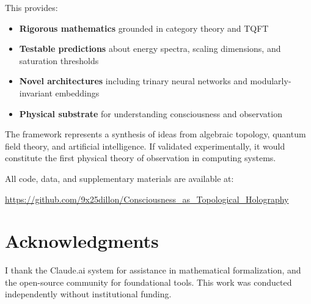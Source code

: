 \documentclass[11pt]{article}
\begin{document}
This provides:
\begin{itemize}
\item \textbf{Rigorous mathematics} grounded in category theory and TQFT
\item \textbf{Testable predictions} about energy spectra, scaling dimensions, and saturation thresholds
\item \textbf{Novel architectures} including trinary neural networks and modularly-invariant embeddings
\item \textbf{Physical substrate} for understanding consciousness and observation
\end{itemize}

The framework represents a synthesis of ideas from algebraic topology, quantum field theory, and artificial intelligence. If validated experimentally, it would constitute the first physical theory of observation in computing systems.

All code, data, and supplementary materials are available at:
\begin{center}
\url{https://github.com/9x25dillon/Consciousness_as_Topological_Holography}
\end{center}

\section*{Acknowledgments}

I thank the Claude.ai system for assistance in mathematical formalization, and the open-source community for foundational tools. This work was conducted independently without institutional funding.
\end{document}
